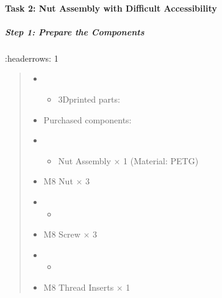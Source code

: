 \documentclass[letterpaper,10pt,english]{sphinxmanual}
\begin{document}
\paragraph{Task 2: Nut Assembly with Difficult Accessibility}
\label{\detokenize{4-Assembly-Instructions-Screws-and-Nuts:task-2-nut-assembly-with-difficult-accessibility}}

\subparagraph{Step 1: Prepare the Components}
\label{\detokenize{4-Assembly-Instructions-Screws-and-Nuts:id1}}
\sphinxAtStartPar
    :header\sphinxhyphen{}rows: 1
\begin{quote}
\begin{itemize}
\item {} \begin{itemize}
\item {} 
\sphinxAtStartPar
3D\sphinxhyphen{}printed parts:

\end{itemize}

\end{itemize}
\begin{itemize}
\item {} 
\sphinxAtStartPar
Purchased components:

\end{itemize}
\begin{itemize}
\item {} \begin{itemize}
\item {} 
\sphinxAtStartPar
Nut Assembly × 1 (Material: PETG)

\end{itemize}

\end{itemize}
\begin{itemize}
\item {} 
\sphinxAtStartPar
M8 Nut × 3

\end{itemize}
\begin{itemize}
\item {} \begin{itemize}
\item {} 
\end{itemize}

\end{itemize}
\begin{itemize}
\item {} 
\sphinxAtStartPar
30mm M8 Screw × 3

\end{itemize}
\begin{itemize}
\item {} \begin{itemize}
\item {} 
\end{itemize}

\end{itemize}
\begin{itemize}
\item {} 
\sphinxAtStartPar
M8 Thread Inserts × 1

\end{itemize}
\end{quote}
\end{document}
